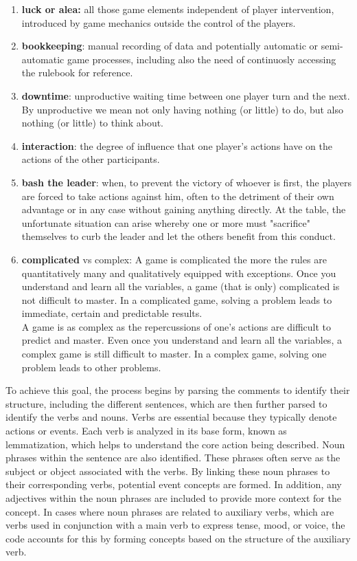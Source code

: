\documentclass[sn-mathphys-num]{sn-jnl}%
\theoremstyle{thmstyleone}%
\theoremstyle{thmstyletwo}%
\theoremstyle{thmstylethree}%
\begin{document}
    \begin{enumerate}
        \item \textbf{luck or alea:} all those game elements independent of player intervention, introduced by game mechanics outside the control of the players.
        \item \textbf{bookkeeping}: manual recording of data and potentially automatic or semi-automatic game processes, including also the need of continuosly accessing the rulebook for reference.
        \item \textbf{downtime}: unproductive waiting time between one player turn and the next. By unproductive we mean not only having nothing (or little) to do, but also nothing (or little) to think about.
        \item \textbf{interaction}: the degree of influence that one player's actions have on the actions of the other participants.
        \item \textbf{bash the leader}: when, to prevent the victory of whoever is first, the players are forced to take actions against him, often to the detriment of their own advantage or in any case without gaining anything directly. At the table, the unfortunate situation can arise whereby one or more must "sacrifice" themselves to curb the leader and let the others benefit from this conduct.
        \item \textbf{complicated} vs complex: A game is complicated the more the rules are quantitatively many and qualitatively equipped with exceptions. Once you understand and learn all the variables, a game (that is only) complicated is not difficult to master. In a complicated game, solving a problem leads to immediate, certain and predictable results.\\A game is as complex as the repercussions of one's actions are difficult to predict and master. Even once you understand and learn all the variables, a complex game is still difficult to master. In a complex game, solving one problem leads to other problems.
    \end{enumerate}
    To achieve this goal, the process begins by parsing the comments to identify their structure, including the different sentences, which are then further parsed to identify the verbs and nouns. Verbs are essential because they typically denote actions or events. Each verb is analyzed in its base form, known as lemmatization, which helps to understand the core action being described. Noun phrases within the sentence are also identified. These phrases often serve as the subject or object associated with the verbs. By linking these noun phrases to their corresponding verbs, potential event concepts are formed. In addition, any adjectives within the noun phrases are included to provide more context for the concept. In cases where noun phrases are related to auxiliary verbs, which are verbs used in conjunction with a main verb to express tense, mood, or voice, the code accounts for this by forming concepts based on the structure of the auxiliary verb.
\end{document}
